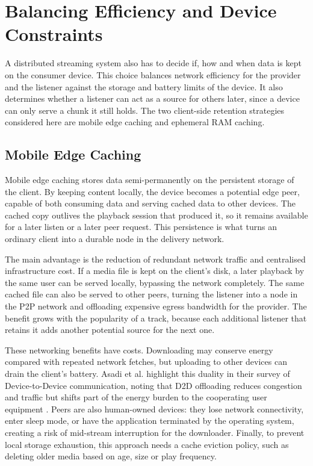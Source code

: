 \section{Balancing Efficiency and Device Constraints}
\indent \par A distributed streaming system also has to decide if, how and when data is kept on the consumer device. This choice balances network efficiency for the provider and the listener against the storage and battery limits of the device. It also determines whether a listener can act as a source for others later, since a device can only serve a chunk it still holds. The two client-side retention strategies considered here are mobile edge caching and ephemeral RAM caching.

\subsection{Mobile Edge Caching}
\indent \par Mobile edge caching stores data semi-permanently on the persistent storage of the client. By keeping content locally, the device becomes a potential edge peer, capable of both consuming data and serving cached data to other devices. The cached copy outlives the playback session that produced it, so it remains available for a later listen or a later peer request. This persistence is what turns an ordinary client into a durable node in the delivery network.

\par The main advantage is the reduction of redundant network traffic and centralised infrastructure cost. If a media file is kept on the client's disk, a later playback by the same user can be served locally, bypassing the network completely. The same cached file can also be served to other peers, turning the listener into a node in the P2P network and offloading expensive egress bandwidth for the provider. The benefit grows with the popularity of a track, because each additional listener that retains it adds another potential source for the next one.

\par These networking benefits have costs. Downloading may conserve energy compared with repeated network fetches, but uploading to other devices can drain the client's battery. Asadi et al. highlight this duality in their survey of Device-to-Device communication, noting that D2D offloading reduces congestion and traffic but shifts part of the energy burden to the cooperating user equipment \cite{d2d_survey}. Peers are also human-owned devices: they lose network connectivity, enter sleep mode, or have the application terminated by the operating system, creating a risk of mid-stream interruption for the downloader. Finally, to prevent local storage exhaustion, this approach needs a cache eviction policy, such as deleting older media based on age, size or play frequency.

